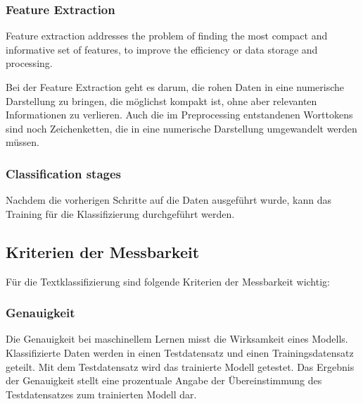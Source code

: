 \subsubsection{Feature Extraction}
\begin{definition}
	\label{def:feature-extraction}
	\glqq Feature extraction addresses the problem of finding the most compact and informative set of features, to improve the efficiency or data storage and processing.\grqq{} \citep{Guyon2006}
\end{definition}
Bei der Feature Extraction geht es darum, die rohen Daten in eine numerische Darstellung zu bringen, die möglichst kompakt ist, ohne aber relevanten Informationen zu verlieren.
Auch die im Preprocessing entstandenen Worttokens sind noch Zeichenketten, die in eine numerische Darstellung umgewandelt werden müssen.

\subsubsection{Classification stages}
Nachdem die vorherigen Schritte auf die Daten ausgeführt wurde, kann das Training für die Klassifizierung durchgeführt werden.

\subsection{Kriterien der Messbarkeit}
\label{c:conception:classification:criteria}
Für die Textklassifizierung sind folgende Kriterien der Messbarkeit wichtig:

\subsubsection{Genauigkeit}
Die Genauigkeit bei maschinellem Lernen misst die Wirksamkeit eines Modells. Klassifizierte Daten werden in einen Testdatensatz und einen Trainingsdatensatz geteilt. Mit dem Testdatensatz wird das trainierte Modell getestet. Das Ergebnis der Genauigkeit stellt eine prozentuale Angabe der Übereinstimmung des Testdatensatzes zum trainierten Modell dar. \citep[vgl.][]{Microsoft_2022_ml}

